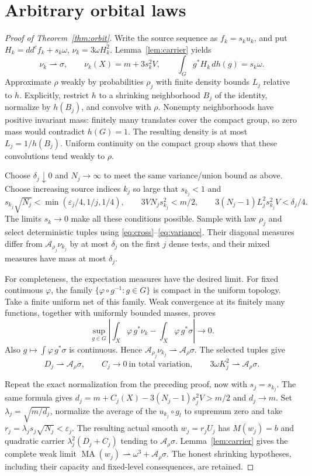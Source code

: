 \documentclass[11pt]{article}
\newcommand{\ddc}{dd^c}
\newcommand{\MA}{\operatorname{MA}}
\begin{document}
\section{Arbitrary orbital laws}
\begin{proof}[Proof of Theorem~\ref{thm:orbit}]
Write the source sequence as $f_k=s_ku_k$, and put
$H_k=\ddc f_k+s_k\omega$, $\nu_k=3\omega H_k^2$.
Lemma~\ref{lem:carrier} yields
\[
 \nu_k\rightharpoonup\sigma,\qquad
 \nu_k(X)=m+3s_k^2V,
 \qquad\int_Gg^*H_k\,dh(g)=s_k\omega.
\]
Approximate $\rho$ weakly by probabilities $\rho_j$ with finite
density bounds $L_j$ relative to $h$. Explicitly, restrict $h$
to a shrinking neighborhood $B_j$ of the identity, normalize by
$h(B_j)$, and convolve with $\rho$. Nonempty neighborhoods have
positive invariant mass: finitely many translates cover the compact
group, so zero mass would contradict $h(G)=1$. The resulting density
is at most $L_j=1/h(B_j)$. Uniform continuity on the compact group
shows that these convolutions tend weakly to $\rho$.

Choose $\delta_j\downarrow0$ and $N_j\to\infty$ to meet the same
variance/union bound as above. Choose increasing source indices $k_j$
so large that $s_{k_j}<1$ and
\[
 s_{k_j}\sqrt{N_j}<\min(\varepsilon_j/4,1/j,1/4),\qquad
 3VN_js_{k_j}^2<m/2,\qquad
 3(N_j-1)L_j^2s_{k_j}^2V<\delta_j/4.
\]
The limits $s_k\to0$ make all these conditions possible.
Sample with law $\rho_j$ and select deterministic tuples using
\eqref{eq:cross}--\eqref{eq:variance}. Their diagonal measures differ
from $\mathcal A_{\rho_j}\nu_{k_j}$ by at most $\delta_j$ on the
first $j$ dense tests, and their mixed measures have mass at most
$\delta_j$.

For completeness, the expectation measures have the desired limit.
For fixed continuous $\varphi$, the family
$\{\varphi\circ g^{-1}:g\in G\}$ is compact in the uniform topology.
Take a finite uniform net of this family. Weak convergence at its
finitely many functions, together with uniformly bounded masses,
proves
\[
 \sup_{g\in G}\left|
      \int_X\varphi\,g^*\nu_k-\int_X\varphi\,g^*\sigma
                  \right|\longrightarrow0.
\]
Also $g\mapsto\int\varphi\,g^*\sigma$ is continuous. Hence
$\mathcal A_{\rho_j}\nu_{k_j}\rightharpoonup\mathcal A_\rho\sigma$.
The selected tuples give
\[
 D_j\rightharpoonup\mathcal A_\rho\sigma,\qquad
 C_j\longrightarrow0\ \text{in total variation},\qquad
 3\omega K_j^2\rightharpoonup\mathcal A_\rho\sigma.
\]

Repeat the exact normalization from the preceding proof, now with
$s_j=s_{k_j}$. The same formula gives
$d_j=m+C_j(X)-3(N_j-1)s_j^2V>m/2$ and $d_j\to m$.
Set $\lambda_j=\sqrt{m/d_j}$, normalize the average of the
$u_{k_j}\circ g_l$ to supremum zero and take
$r_j=\lambda_js_j\sqrt{N_j}<\varepsilon_j$.
The resulting actual smooth $w_j=r_jU_j$ has $M(w_j)=b$ and
quadratic carrier $\lambda_j^2(D_j+C_j)$ tending to
$\mathcal A_\rho\sigma$. Lemma~\ref{lem:carrier} gives the complete
weak limit $\MA(w_j)\rightharpoonup\omega^3+\mathcal A_\rho\sigma$.
The honest shrinking hypotheses, including their capacity and
fixed-level consequences, are retained.
\end{proof}
\end{document}
